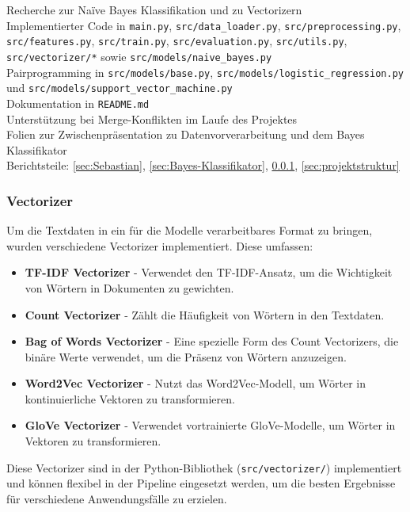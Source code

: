 Recherche zur Na\"{i}ve Bayes Klassifikation und zu Vectorizern \\
Implementierter Code in \texttt{main.py}, \texttt{src/data\_loader.py}, \texttt{src/preprocessing.py}, \texttt{src/features.py}, \texttt{src/train.py}, \texttt{src/evaluation.py}, \texttt{src/utils.py}, \texttt{src/vectorizer/*} sowie \texttt{src/models/naive\_bayes.py} \\
Pairprogramming in \texttt{src/models/base.py}, \texttt{src/models/logistic\_regression.py} und \texttt{src/models/support\_vector\_machine.py} \\
Dokumentation in \texttt{README.md} \\
Unterst\"{u}tzung bei Merge-Konflikten im Laufe des Projektes \\
Folien zur Zwischenpr\"{a}sentation zu Datenvorverarbeitung und dem Bayes Klassifikator \\
Berichtsteile: \ref{sec:Sebastian}, \ref{sec:Bayes-Klassifikator}, \ref{sec:vectorizer}, \ref{sec:projektstruktur}

\subsubsection{Vectorizer}
\label{sec:vectorizer}
Um die Textdaten in ein für die Modelle verarbeitbares Format zu bringen, wurden verschiedene Vectorizer implementiert. Diese umfassen:

\begin{itemize}
    \item \textbf{TF-IDF Vectorizer} - Verwendet den TF-IDF-Ansatz, um die Wichtigkeit von Wörtern in Dokumenten zu gewichten.
    \item \textbf{Count Vectorizer} - Zählt die Häufigkeit von Wörtern in den Textdaten.
    \item \textbf{Bag of Words Vectorizer} - Eine spezielle Form des Count Vectorizers, die binäre Werte verwendet, um die Präsenz von Wörtern anzuzeigen.
    \item \textbf{Word2Vec Vectorizer} - Nutzt das Word2Vec-Modell, um Wörter in kontinuierliche Vektoren zu transformieren.
    \item \textbf{GloVe Vectorizer} - Verwendet vortrainierte GloVe-Modelle, um Wörter in Vektoren zu transformieren.
\end{itemize}

Diese Vectorizer sind in der Python-Bibliothek (\texttt{src/vectorizer/}) implementiert und können flexibel in der Pipeline eingesetzt werden, um die besten Ergebnisse für verschiedene Anwendungsfälle zu erzielen.
